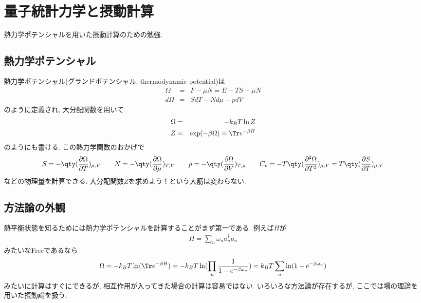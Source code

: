 \documentclass[10.5pt,a4paper]{jreport}
\begin{document}
\section{量子統計力学と摂動計算}
熱力学ポテンシャルを用いた摂動計算のための勉強.
\subsection{熱力学ポテンシャル}
熱力学ポテンシャル(グランドポテンシャル, thermodynamic potential)は
\begin{eqnarray}
  \Omega &=& F - \mu N = E - TS -\mu N\\
  d\Omega &=& SdT - Nd\mu -pdV
\end{eqnarray}
のように定義され, 大分配関数を用いて
\begin{eqnarray}
  \Omega &=& -k_BT\ln Z\\
  Z &=& \exp(-\beta\Omega) = \Tr e^{-\beta H}
\end{eqnarray}
のようにも書ける. この熱力学関数のおかげで
\begin{eqnarray}
  S = -\qty(\frac{\partial\Omega}{\partial T})_{\mu, V}\hspace{0.7cm}N = -\qty(\frac{\partial\Omega}{\partial \mu})_{T, V}\hspace{0.7cm}p = -\qty(\frac{\partial\Omega}{\partial V})_{T, \mu}\hspace{0.7cm}C_v = -T\qty(\frac{\partial^2\Omega}{\partial T^2})_{\mu, V} = T\qty(\frac{\partial S}{\partial T})_{\mu, V}
\end{eqnarray}
などの物理量を計算できる. 大分配関数$Z$を求めよう！という大筋は変わらない.
\subsection{方法論の外観}
熱平衡状態を知るためには熱力学ポテンシャルを計算することがまず第一である.
例えば$H$が
\begin{eqnarray}
  H = \sum_n \omega_n a_n^\dagger a_n
\end{eqnarray}
みたいなFreeであるなら
\begin{eqnarray}
  \Omega = -k_BT\ln(\Tr e^{-\beta H}) = -k_BT\ln(\prod_n\frac{1}{1-e^{-\beta \omega_n}}) = k_BT\sum_n\ln(1-e^{-\beta \omega_n})
\end{eqnarray}
みたいに計算はすぐにできるが, 相互作用が入ってきた場合の計算は容易ではない. いろいろな方法論が存在するが, ここでは場の理論を用いた摂動論を扱う.
\end{document}
